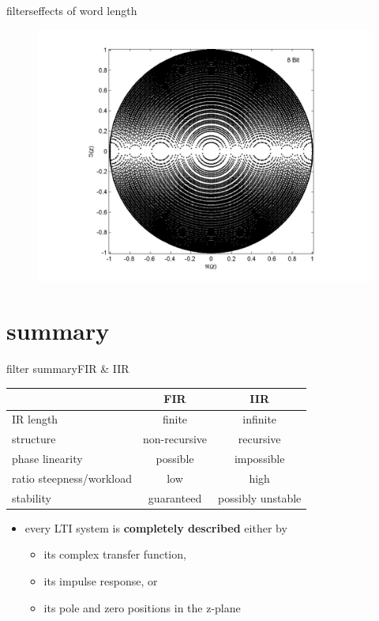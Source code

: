 \begin{frame}{filters}{effects of word length}
{\begin{figure}[!hbt]
\begin{center}
						\includegraphics[scale=.35]{graph/QuantPolePlotDirect_4}
					\end{center}
				\end{figure}
			}
            \vspace{50mm}
 		\end{frame}
\section{summary}
		\begin{frame}{filter summary}{FIR \& IIR}
            \begin{table}
                \centering
                    \begin{tabular}{l|cc}
                        & \textbf{FIR} & \textbf{IIR}\\
                        \hline
                        IR length & finite & infinite\\
                        structure & non-recursive & recursive\\
                        phase linearity & possible & impossible\\
                        ratio steepness/workload & low & high\\
                        stability & guaranteed & possibly unstable
                    \end{tabular}
            \end{table}
            \begin{itemize}
                \item   every LTI system is \textbf{completely described} either by
                    \begin{itemize}
                        \item   its complex transfer function,
                        \item   its impulse response, or
                        \item   its pole and zero positions in the z-plane
                    \end{itemize}
            \end{itemize}
 		\end{frame}



